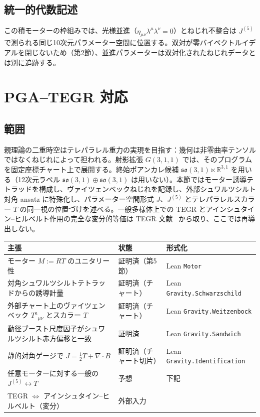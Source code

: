 \documentclass[dvipdfmx,11pt,a4paper]{article}
\theoremstyle{definition}
\theoremstyle{plain}
\theoremstyle{remark}
\begin{document}
\subsection{統一的代数記述}

この積モーターの枠組みでは、光様並進（$\eta_{\mu\nu}\lambda^{\mu}\lambda^{\nu}=0$）とねじれ不整合は $J^{(5)}$ で測られる同じ10次元パラメーター空間に位置する。双対が零バイベクトルイデアルを閉じないため（第2節）、並進パラメーターは双対化されたねじれデータとは別に追跡する。

\section{PGA--TEGR 対応}
\label{sec:pga-tegr}
\label{sec:schwarzschild-pga}

\subsection{範囲}

親理論の二重時空はテレパラレル重力の実現を目指す：幾何は非零曲率テンソルではなくねじれによって担われる。射影拡張 $G(3,1,1)$ では、そのプログラムを固定座標チャート上で展開する。終始ポアンカレ候補
$\mathfrak{so}(3,1)\ltimes\mathbb{R}^{3,1}$ を用いる（12次元ラベル $\mathfrak{so}(3,1)\oplus\mathfrak{so}(3,1)$ は用いない）。本節ではモーター誘導テトラッドを構成し、ヴァイツェンベックねじれを記録し、外部シュワルツシルト対角 ansatz に特殊化し、パラメーター空間形式 $J$、$J^{(5)}$ とテレパラレルスカラー $T$ の同一視の位置づけを述べる。一般多様体上での TEGR とアインシュタイン--ヒルベルト作用の完全な変分的等価は TEGR 文献~\cite{maluf2013} から取り、ここでは再導出しない。

\begin{center}
\footnotesize
\setlength{\tabcolsep}{4pt}
\begin{tabular}{@{}p{}p{}l@{}}
\hline
主張 & 状態 & 形式化 \\
\hline
モーター $M:=RT$ のユニタリー性 & 証明済（第5節） & Lean \texttt{Motor} \\
対角シュワルツシルトテトラッドからの誘導計量 & 証明済（チャート） & Lean \texttt{Gravity.Schwarzschild} \\
外部チャート上のヴァイツェンベック $T^{a}{}_{\mu\nu}$ とスカラー $T$ & 証明済（チャート） & Lean \texttt{Gravity.Weitzenbock} \\
動径ブースト尺度因子がシュワルツシルト赤方偏移と一致 & 証明済 & Lean \texttt{Gravity.Sandwich} \\
静的対角ゲージで $J=\tfrac12 T+\nabla\cdot B$ & 証明済（チャート切片） & Lean \texttt{Gravity.Identification} \\
任意モーターに対する一般の $J^{(5)}\leftrightarrow T$ & 予想 & 下記 \\
TEGR $\Leftrightarrow$ アインシュタイン--ヒルベルト（変分） & 外部入力 & \cite{maluf2013} \\
\hline
\end{tabular}
\end{center}
\end{document}
